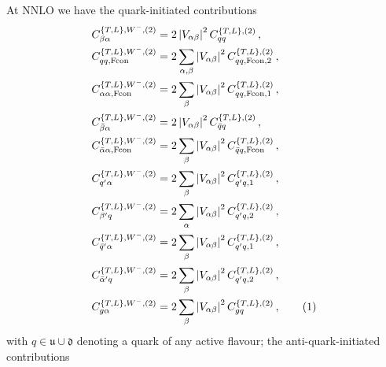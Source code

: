 \documentclass[11pt,a4paper]{article}
\newcommand{\qb}{\bar{q}}
\newcommand{\qp}{{q^\prime}}
\newcommand{\qbp}{{\bar{q}^\prime}}
\newcommand\numberthis{\addtocounter{equation}{1}\tag{\theequation}}
\newcommand{\Fcon}{\mathrm{Fcon}}
\begin{document}
At NNLO we have the quark-initiated contributions
\begin{align*}
C^{\{T,L\},W^-,(2)}_{\beta\alpha} & =2\left|V_{\alpha\beta} \right|^2 C^{\{T,L\},(2)}_{qq}  \,  , \\
C^{\{T,L\},W^-,(2)}_{qq,\Fcon} &= 2\sum_{\alpha,\beta}  \left|V_{\alpha\beta} \right|^2  C^{\{T,L\},(2)}_{qq, \Fcon,2} \,  , \\
C^{\{T,L\},W^-,(2)}_{\alpha\alpha,\Fcon} &= 2\sum_\beta \left|V_{\alpha\beta} \right|^2 C^{\{T,L\},(2)}_{qq, \Fcon,1}   \,  , \\
C^{\{T,L\},W^-,(2)}_{\bar{\beta} \alpha} & = 2\left|V_{\alpha\beta} \right|^2 C^{\{T,L\},(2)}_{\qb q}  \,  , \\
C^{\{T,L\},W^-,(2)}_{\bar{\alpha} \alpha, \Fcon} &= 2\sum_\beta \left|V_{\alpha\beta} \right|^2 C^{\{T,L\},(2)}_{\qb q, \Fcon}  \,  , \\
C^{\{T,L\},W^-,(2)}_{\qp \alpha} & = 2\sum_\beta \left|V_{\alpha\beta}\right|^2 C^{\{T,L\},(2)}_{\qp q, 1}  \,  , \\
C^{\{T,L\},W^-,(2)}_{\beta' q} & =  2\sum_\alpha \left|V_{\alpha\beta}\right|^2 C^{\{T,L\},(2)}_{\qp q, 2} \,  , \\
C^{\{T,L\},W^-,(2)}_{\qbp \alpha} & = 2\sum_\beta \left|V_{\alpha\beta}\right|^2  C^{\{T,L\},(2)}_{\qp q, 1}  \,  , \\
C^{\{T,L\},W^-,(2)}_{\bar{\alpha}' q} & = 2\sum_\beta \left|V_{\alpha\beta}\right|^2 C^{\{T,L\},(2)}_{\qp q, 2} \,  , \\
C^{\{T,L\},W^-,(2)}_{g\alpha} &=  2\sum_\beta \left|V_{\alpha\beta}\right|^2 C^{\{T,L\},(2)}_{gq} \, , \numberthis
\end{align*}
with $q\in\mathfrak{u}\cup\mathfrak{d}$ denoting a quark of any active flavour; the anti-quark-initiated contributions
\end{document}
